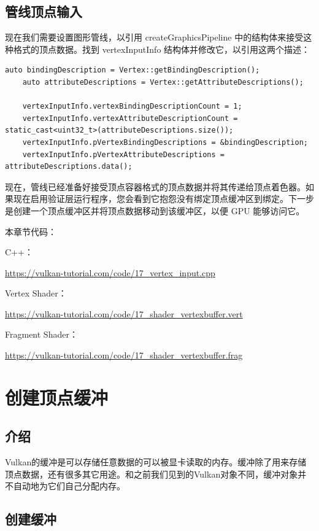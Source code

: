 \documentclass{ctexart}
\begin{document}
\subsection{管线顶点输入}
现在我们需要设置图形管线，以引用 createGraphicsPipeline 中的结构体来接受这种格式的顶点数据。找到 vertexInputInfo 结构体并修改它，以引用这两个描述：
\begin{lstlisting}[language={[ANSI]C}]
	auto bindingDescription = Vertex::getBindingDescription();
	auto attributeDescriptions = Vertex::getAttributeDescriptions();
	
	vertexInputInfo.vertexBindingDescriptionCount = 1;
	vertexInputInfo.vertexAttributeDescriptionCount = static_cast<uint32_t>(attributeDescriptions.size());
	vertexInputInfo.pVertexBindingDescriptions = &bindingDescription;
	vertexInputInfo.pVertexAttributeDescriptions = attributeDescriptions.data();	
\end{lstlisting}
现在，管线已经准备好接受顶点容器格式的顶点数据并将其传递给顶点着色器。如果现在启用验证层运行程序，您会看到它抱怨没有绑定顶点缓冲区到绑定。下一步是创建一个顶点缓冲区并将顶点数据移动到该缓冲区，以便 GPU 能够访问它。

本章节代码：

C++：

\url{https://vulkan-tutorial.com/code/17_vertex_input.cpp}

Vertex Shader：

\url{https://vulkan-tutorial.com/code/17_shader_vertexbuffer.vert}

Fragment Shader：

\url{https://vulkan-tutorial.com/code/17_shader_vertexbuffer.frag}

\newpage
\section{创建顶点缓冲}

\subsection{介绍}

Vulkan的缓冲是可以存储任意数据的可以被显卡读取的内存。缓冲除了用来存储顶点数据，还有很多其它用途。和之前我们见到的Vulkan对象不同，缓冲对象并不自动地为它们自己分配内存。

\subsection{创建缓冲}
\end{document}
